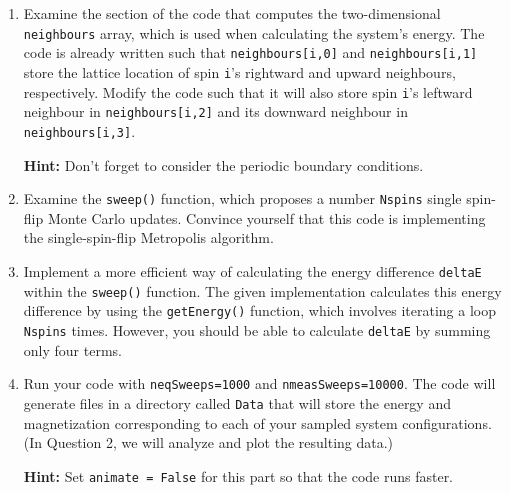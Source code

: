\documentclass[letterpaper]{scrartcl}
\begin{document}
\begin{enumerate}[label=\alph*)]

\item Examine the section of the code that computes the two-dimensional \texttt{neighbours} array, which is used when calculating the system's energy. 
The code is already written such that \texttt{neighbours[i,0]} and \texttt{neighbours[i,1]} 
store the lattice location of spin \texttt{i}'s rightward and upward neighbours, respectively.
Modify the code such that it will also store spin \texttt{i}'s leftward neighbour in \texttt{neighbours[i,2]} and its downward neighbour in \texttt{neighbours[i,3]}.

\textbf{Hint:} Don't forget to consider the periodic boundary conditions.

\item Examine the \texttt{sweep()} function, which proposes a number \texttt{N{\textunderscore}spins} single spin-flip Monte Carlo updates.
Convince yourself that this code is implementing the single-spin-flip Metropolis algorithm.

\item Implement a more efficient way of calculating the energy difference \texttt{deltaE} within the \texttt{sweep()} function. 
The given implementation calculates this energy difference by using the \texttt{getEnergy()} function, 
which involves iterating a loop \texttt{N{\textunderscore}spins} times.
However, you should be able to calculate \texttt{deltaE} by summing only four terms.



\item Run your code with %
\texttt{n{\textunderscore}eqSweeps=1000} and \texttt{n{\textunderscore}measSweeps=10000}.
The code will generate files in a directory called \texttt{Data} that will store the energy and magnetization 
corresponding to each of your sampled system configurations.
(In Question 2, we will analyze and plot the resulting data.)

\textbf{Hint:} Set \texttt{animate = False} for this part so that the code runs faster.

\end{enumerate}
\end{document}
